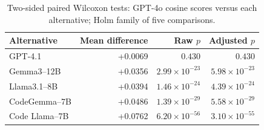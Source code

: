 \begin{table}[H]
\centering\small
\caption{Two-sided paired Wilcoxon tests: GPT-4o cosine scores versus each alternative; Holm family of five comparisons.}
\label{tab:wilcoxon}
\begin{tabular}{@{}lrrr@{}}
\toprule
Alternative & Mean difference & Raw $p$ & Adjusted $p$\\
\midrule
GPT-4.1 & +0.0069 & $0.430$ & $0.430$\\
Gemma3--12B & +0.0356 & $2.99\times 10^{-23}$ & $5.98\times 10^{-23}$\\
Llama3.1--8B & +0.0394 & $1.46\times 10^{-24}$ & $4.39\times 10^{-24}$\\
CodeGemma--7B & +0.0486 & $1.39\times 10^{-29}$ & $5.58\times 10^{-29}$\\
Code Llama--7B & +0.0762 & $6.20\times 10^{-56}$ & $3.10\times 10^{-55}$\\
\bottomrule
\end{tabular}
\par\vspace{0.3em}{\footnotesize All comparisons contain 1,318 pairs; zero differences are excluded from signed-rank computation. Positive differences favor GPT-4o.}
\end{table}
